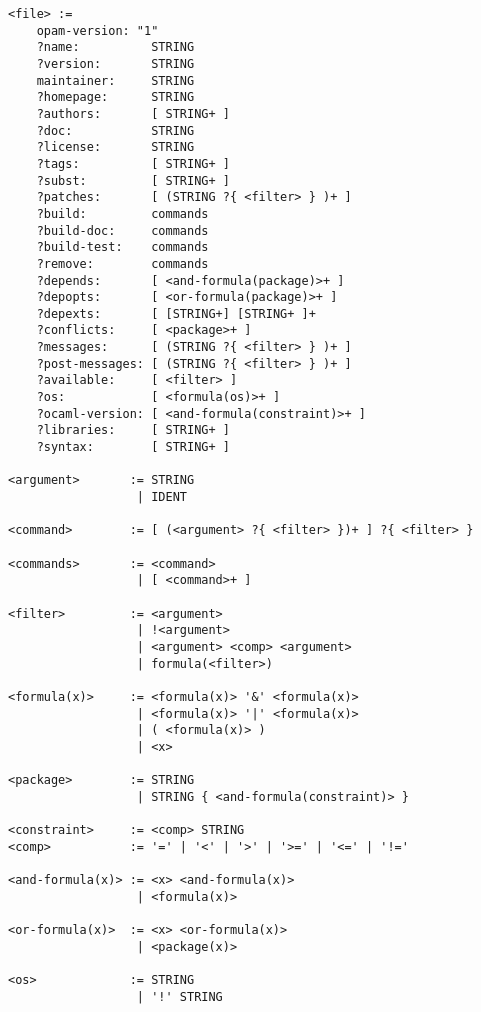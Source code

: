 \documentclass[a4paper,10pt]{article}
\begin{document}
{\small
\begin{Verbatim}[frame=single]
<file> :=
    opam-version: "1"
    ?name:          STRING
    ?version:       STRING
    maintainer:     STRING
    ?homepage:      STRING
    ?authors:       [ STRING+ ]
    ?doc:           STRING
    ?license:       STRING
    ?tags:          [ STRING+ ]
    ?subst:         [ STRING+ ]
    ?patches:       [ (STRING ?{ <filter> } )+ ]
    ?build:         commands
    ?build-doc:     commands
    ?build-test:    commands
    ?remove:        commands
    ?depends:       [ <and-formula(package)>+ ]
    ?depopts:       [ <or-formula(package)>+ ]
    ?depexts:       [ [STRING+] [STRING+ ]+
    ?conflicts:     [ <package>+ ]
    ?messages:      [ (STRING ?{ <filter> } )+ ]
    ?post-messages: [ (STRING ?{ <filter> } )+ ]
    ?available:     [ <filter> ]
    ?os:            [ <formula(os)>+ ]
    ?ocaml-version: [ <and-formula(constraint)>+ ]
    ?libraries:     [ STRING+ ]
    ?syntax:        [ STRING+ ]

<argument>       := STRING
                  | IDENT

<command>        := [ (<argument> ?{ <filter> })+ ] ?{ <filter> }

<commands>       := <command>
                  | [ <command>+ ]

<filter>         := <argument>
                  | !<argument>
                  | <argument> <comp> <argument>
                  | formula(<filter>)

<formula(x)>     := <formula(x)> '&' <formula(x)>
                  | <formula(x)> '|' <formula(x)>
                  | ( <formula(x)> )
                  | <x>

<package>        := STRING
                  | STRING { <and-formula(constraint)> }

<constraint>     := <comp> STRING
<comp>           := '=' | '<' | '>' | '>=' | '<=' | '!='

<and-formula(x)> := <x> <and-formula(x)>
                  | <formula(x)>

<or-formula(x)>  := <x> <or-formula(x)>
                  | <package(x)>

<os>             := STRING
                  | '!' STRING
\end{Verbatim}
}
\end{document}
